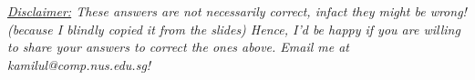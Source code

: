 \documentclass[10pt,a4paper]{exam}
\makeatletter
\newcommand{\authoremail}{kamilul@comp.nus.edu.sg} %
\makeatother
\begin{document}
\begin{questions}

 \ifprintanswers \begin{small}\em \underline{Disclaimer:} These answers are not necessarily correct, infact they might be wrong! (because I blindly copied it from the slides) Hence, I'd be happy if you are willing to share your answers to correct the ones above. Email me at \authoremail!\end{small} \fi


\end{questions}
\end{document}
